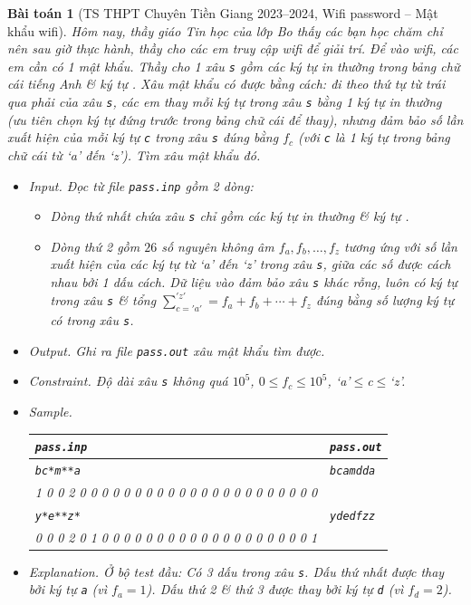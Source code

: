 \documentclass{article}
\newtheorem{baitoan}{Bài toán}
\begin{document}
\begin{baitoan}[TS THPT Chuyên Tiền Giang 2023--2024, Wifi password -- Mật khẩu wifi]
	Hôm nay, thầy giáo Tin học của lớp Bo thấy các bạn học chăm chỉ nên sau giờ thực hành, thầy cho các em truy cập wifi để giải trí. Để vào wifi, các em cần có 1 mật khẩu. Thầy cho 1 xâu {\tt s} gồm các ký tự in thường trong bảng chữ cái tiếng Anh \& ký tự {\tt*}. Xâu mật khẩu có được bằng cách: đi theo thứ tự từ trái qua phải của xâu {\tt s}, các em thay mỗi ký tự {\tt*} trong xâu {\tt s} bằng 1 ký tự in thường (ưu tiên chọn ký tự đứng trước trong bảng chữ cái để thay), nhưng đảm bảo số lần xuất hiện của mỗi ký tự {\tt c} trong xâu {\tt s} đúng bằng $f_c$ (với {\tt c} là 1 ký tự trong bảng chữ cái từ `a' đến `z'). Tìm xâu mật khẩu đó.
	\begin{itemize}
		\item {\sf Input.} Đọc từ file {\tt pass.inp} gồm 2 dòng:
		\begin{itemize}
			\item Dòng thứ nhất chứa xâu {\tt s} chỉ gồm các ký tự in thường \& ký tự {\tt*}.
			\item Dòng thứ 2 gồm $26$ số nguyên không âm $f_a,f_b,\ldots,f_z$ tương ứng với số lần xuất hiện của các ký tự từ `a' đến `z' trong xâu {\tt s}, giữa các số được cách nhau bởi 1 dấu cách. Dữ liệu vào đảm bảo xâu {\tt s} khác rỗng, luôn có ký tự {\tt*} trong xâu {\tt s} \& tổng $\sum_{c='a'}^{'z'} = f_a + f_b + \cdots + f_z$ đúng bằng số lượng ký tự {\tt*} có trong xâu {\tt s}.
		\end{itemize}
		\item {\sf Output.} Ghi ra file {\tt pass.out} xâu mật khẩu tìm được.
		\item {\sf Constraint.} Độ dài xâu {\tt s} không quá $10^5$, $0\le f_c\le10^5$, `a'$\le$c$\le$`z'.
		\item {\sf Sample.}
		\begin{table}[H]
			\centering
			\begin{tabular}{|l|l|}
				\hline
				\texttt{pass.inp} & \texttt{pass.out} \\
				\hline
				\texttt{bc*m**a} & \texttt{bcamdda} \\
				1 0 0 2 0 0 0 0 0 0 0 0 0 0 0 0 0 0 0 0 0 0 0 0 0 0 & \\
				\hline
				\texttt{y*e**z*} & \texttt{ydedfzz} \\
				0 0 0 2 0 1 0 0 0 0 0 0 0 0 0 0 0 0 0 0 0 0 0 0 0 1 & \\
				\hline
			\end{tabular}
		\end{table}
		\item {\sf Explanation.} Ở bộ test đầu: Có 3 dấu {\tt*} trong xâu {\tt s}. Dấu {\tt*} thứ nhất được thay bởi ký tự {\tt a} (vì $f_a = 1$). Dấu {\tt*}  thứ 2 \& thứ 3 được thay bởi ký tự {\tt d} (vì $f_d = 2$).
	\end{itemize}
\end{baitoan}
\end{document}
